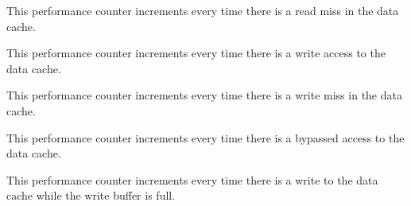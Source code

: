 This performance counter increments every time there is a read miss in the data 
cache.

\implementation{}


This performance counter increments every time there is a write access to the 
data cache.

\implementation{}


This performance counter increments every time there is a write miss in the data 
cache.

\implementation{}


This performance counter increments every time there is a bypassed access to the 
data cache.

\implementation{}


This performance counter increments every time there is a write to the data 
cache while the write buffer is full.

\implementation{}
